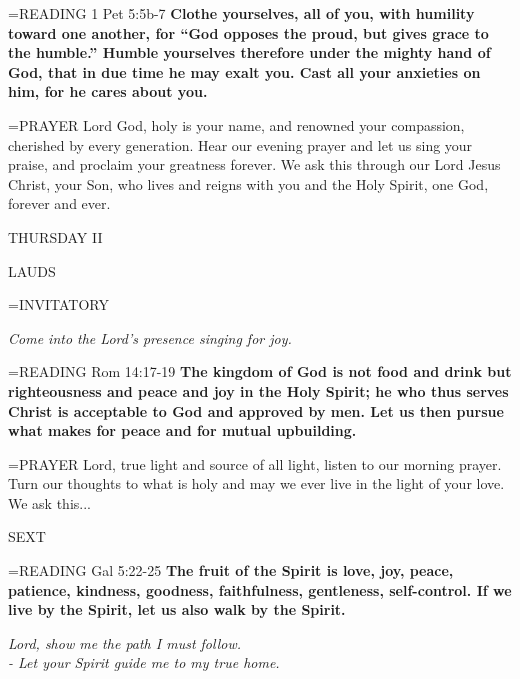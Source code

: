 \hangindent=\parindent \small{READING} 1 Pet 5:5b-7 \textbf{Clothe yourselves, all of you, with humility toward one another, for “God opposes the proud, but gives grace to the humble.” Humble yourselves therefore under the mighty hand of God, that in due time he may exalt you. Cast all your anxieties on him, for he cares about you.\\}

\hangindent=\parindent \small{PRAYER  Lord God, holy is your name, and renowned your compassion, cherished by every generation. Hear our evening prayer and let us sing your praise, and proclaim your greatness forever. We ask this through our Lord Jesus Christ, your Son, who lives and reigns with you and the Holy Spirit, one God, forever and ever.  }

\begin{center}
\normalsize THURSDAY II
\end{center}

\begin{flushleft}\normalsize LAUDS\\\end{flushleft}

\hangindent=\parindent \small{INVITATORY}
\begin{center}
\textit{Come into the Lord’s presence singing for joy.\\}
\end{center}

\hangindent=\parindent \small{READING} Rom 14:17-19 \textbf{The kingdom of God is not food and drink but righteousness and peace and joy in the Holy Spirit; he who thus serves Christ is acceptable to God and approved by men. Let us then pursue what makes for peace and for mutual upbuilding.\\}

\hangindent=\parindent \small{PRAYER  Lord, true light and source of all light, listen to our morning prayer. Turn our thoughts to what is holy and may we ever live in the light of your love. We ask this...}

\begin{flushleft}\normalsize SEXT\\\end{flushleft}

\hangindent=\parindent \small{READING} Gal 5:22-25 \textbf{The fruit of the Spirit is love, joy, peace, patience, kindness, goodness, faithfulness, gentleness, self-control. If we live by the Spirit, let us also walk by the Spirit.}

\begin{center}
\textit{Lord, show me the path I must follow.\\
- Let your Spirit guide me to my true home.}
\end{center}

